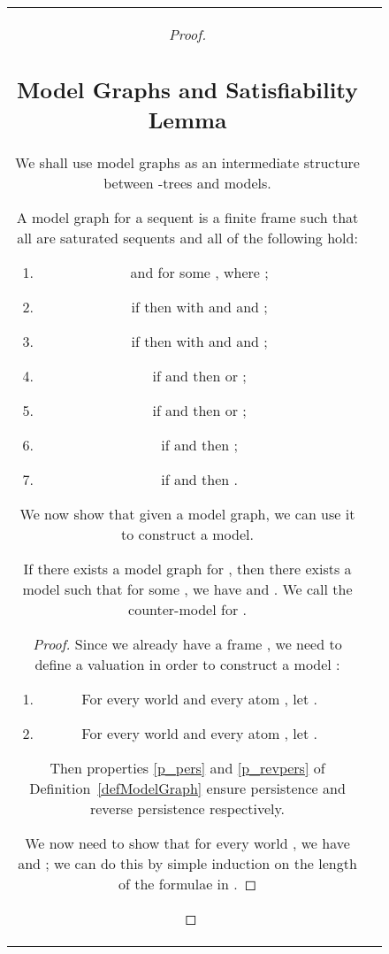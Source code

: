 \documentclass{llncs}
\numberwithin{equation}{section}
\begin{document}
\begin{figure}[t]
\begin{tabular}{cc}
\begin{proof}
\begin{enumerate}
\subsection{Model Graphs and Satisfiability Lemma}

We shall use model graphs as an intermediate structure between -trees and  models.

\begin{definition}\label{defModelGraph}
A model graph for a sequent  is a finite  frame  such that all  are saturated sequents  and all of the following hold:
	\begin{enumerate}
		\item  and  for some , where ;
		\item\label{p_impRight} if  then  with  and  and ;
		\item\label{p_weakImpLeft} if  then  with  and  and ;
		\item\label{p_impLeft} if  and  then  or ;
		\item\label{p_weakImpRight} if  and  then  or ;
		\item\label{p_pers} if  and  then ;
		\item\label{p_revpers} if  and  then .	
	\end{enumerate}
\end{definition}

\noindent We now show that given a model graph, we can use it to construct a  model.

\begin{lemma}\label{modelGraphToModel}
If there exists a model graph  for , then there exists a  model  such that for some , we have  and . We call  the counter-model for .
\end{lemma}
\begin{proof}
Since we already have a  frame , we need to define a valuation  in order to construct a  model :
\begin{enumerate}
	\item For every world  and every atom , let .
	\item For every world  and every atom , let . 
\end{enumerate}

Then properties \ref{p_pers} and \ref{p_revpers} of Definition~\ref{defModelGraph} ensure persistence and reverse persistence respectively.

We now need to show that for every world , we have  and ; we can do this by simple induction on  the length of the formulae in .


\end{proof}
\end{enumerate}
\end{proof}
\end{tabular}
\end{figure}
\end{document}
